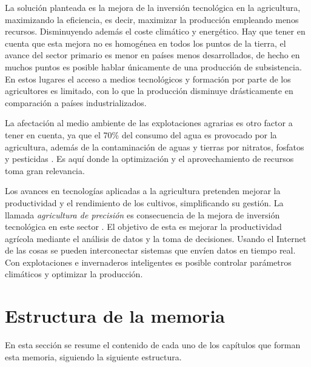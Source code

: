\documentclass[a4paper, 12pt, oneside]{book}
\begin{document}
La solución planteada es la mejora de la inversión tecnológica en la agricultura, maximizando la eficiencia, es decir, maximizar la producción empleando menos recursos. Disminuyendo además el coste climático y energético. Hay que tener en cuenta que esta mejora no es homogénea en todos los puntos de la tierra, el avance del sector primario es menor en países menos desarrollados, de hecho en muchos puntos es posible hablar únicamente de una producción de subsistencia. En estos lugares el acceso a medios tecnológicos y formación por parte de los agricultores es limitado, con lo que la producción disminuye drásticamente en comparación a países industrializados.

La afectación al medio ambiente de las explotaciones agrarias es otro factor a tener en cuenta, ya que el 70\% del consumo del agua es provocado por la agricultura, además de la contaminación de aguas y tierras por nitratos, fosfatos y pesticidas \cite{agricultura_agua}. Es aquí donde la optimización y el aprovechamiento de recursos toma gran relevancia.

Los avances en tecnologías aplicadas a la agricultura pretenden mejorar la productividad y el rendimiento de los cultivos, simplificando su gestión. La llamada \textit{agricultura de precisión} es consecuencia de la mejora de inversión tecnológica en este sector \cite{agricultura_precision}. El objetivo de esta es mejorar la productividad agrícola mediante el análisis de datos y la toma de decisiones. Usando el Internet de las cosas se pueden interconectar sistemas que envíen datos en tiempo real. Con explotaciones e invernaderos inteligentes es posible controlar parámetros climáticos y optimizar la producción.

\section{Estructura de la memoria}
\label{sec:estructura}

En esta sección se resume el contenido de cada uno de los capítulos que forman esta memoria, siguiendo la siguiente estructura.
\end{document}
